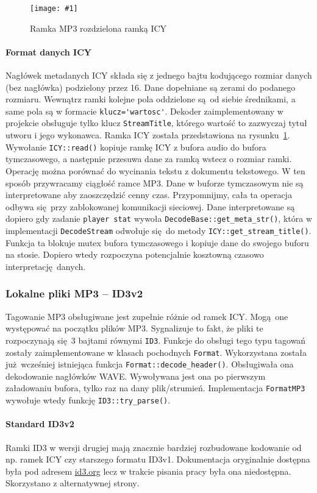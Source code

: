 \documentclass[polish]{aghengthesis}
\newcommand{\imgint}[4]{
	\begin{figure}[{#4}]
		\centering
		\texttt{[image: \#1]}
		\caption{#2}
		\label{#1}
	\end{figure}
}
\newcommand{\imgcs}[3]{\imgint{#1}{#2}{#3}{}}
\begin{document}
			\imgcs{3/PicoRadio-icy}{Ramka MP3 rozdzielona ramką ICY}{0.9}
			\paragraph{Format danych ICY}
				Nagłówek metadanych ICY składa się z jednego bajtu kodującego rozmiar danych (bez nagłówka) podzielony przez 16. Dane dopełniane są zerami do podanego rozmiaru. Wewnątrz ramki kolejne pola oddzielone są od siebie średnikami, a same pola są w formacie \lstinline|klucz='wartosc'|. Dekoder zaimplementowany w projekcie obsługuje tylko klucz \lstinline|StreamTitle|, którego wartość to zazwyczaj tytuł utworu i jego wykonawca. Ramka ICY została przedstawiona na rysunku~\ref{3/PicoRadio-icy}.
				$ $\\
				
			Wywołanie \lstinline|ICY::read()| kopiuje ramkę ICY z bufora audio do bufora tymczasowego, a następnie przesuwa dane za ramką wstecz o rozmiar ramki. Operację można porównać do wycinania tekstu z dokumentu tekstowego. W ten sposób przywracamy ciągłość ramce MP3. Dane w buforze tymczasowym nie są interpretowane aby zaoszczędzić cenny czas. Przypomnijmy, cała ta operacja odbywa się przy zablokowanej komunikacji sieciowej. Dane interpretowane są dopiero gdy zadanie \lstinline|player stat| wywoła \lstinline|DecodeBase::get_meta_str()|, która w implementacji \lstinline|DecodeStream| odwołuje się do metody \lstinline|ICY::get_stream_title()|. Funkcja ta blokuje mutex bufora tymczasowego i kopiuje dane do swojego buforu na stosie. Dopiero wtedy rozpoczyna potencjalnie kosztowną czasowo interpretację danych.
		
		\subsubsection{Lokalne pliki MP3 -- ID3v2}
			Tagowanie MP3 obsługiwane jest zupełnie różnie od ramek ICY. Mogą one występować na początku plików MP3. Sygnalizuje to fakt, że pliki te rozpoczynają się 3 bajtami równymi \lstinline|ID3|. Funkcje do obsługi tego typu tagowań zostały zaimplementowane w klasach pochodnych \lstinline|Format|. Wykorzystana została już wcześniej istniejąca funkcja \lstinline|Format::decode_header()|. Obsługiwała ona dekodowanie nagłówków WAVE. Wywoływana jest ona po pierwszym załadowaniu bufora, tylko raz na dany plik/strumień. Implementacja \lstinline|FormatMP3| wywołuje wtedy funkcję \lstinline|ID3::try_parse()|.
			
			\paragraph{Standard ID3v2}
			Ramki ID3 w wersji drugiej mają znacznie bardziej rozbudowane kodowanie od np. ramek ICY czy starszego formatu ID3v1. Dokumentacja oryginalnie dostępna była pod adresem \href{id3.org}{id3.org} lecz w trakcie pisania pracy była ona niedostępna. Skorzystano z alternatywnej strony\textsuperscript{\cite{id3_spec_mutagen}}.
			
\end{document}
